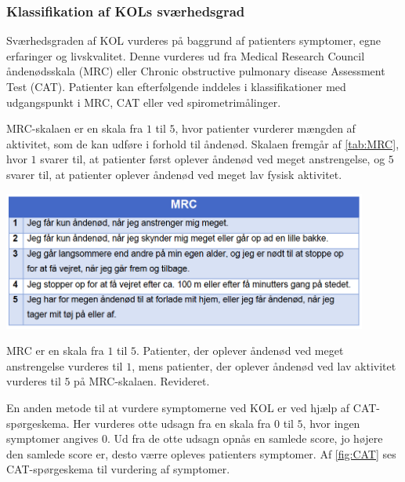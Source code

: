 \subsubsection{Klassifikation af KOLs sværhedsgrad} \label{sec:klassifikation}
Sværhedsgraden af KOL vurderes på baggrund af patienters symptomer, egne erfaringer og livskvalitet. Denne vurderes ud fra Medical Research Council åndenødsskala (MRC) eller Chronic obstructive pulmonary disease Assessment Test (CAT). Patienter kan efterfølgende inddeles i klassifikationer med udgangspunkt i MRC, CAT eller ved spirometrimålinger.\cite{Basisbogen2016}

 
MRC-skalaen er en skala fra $1$ til $5$, hvor patienter vurderer mængden af aktivitet, som de kan udføre i forhold til åndenød. Skalaen fremgår af \autoref{tab:MRC}, hvor $1$ svarer til, at patienter først oplever åndenød ved meget anstrengelse, og $5$ svarer til, at patienter oplever åndenød ved meget lav fysisk aktivitet.\cite{Basisbogen2016}

\begin{table} [H]
\centering
\includegraphics[width=0.9\textwidth]{figures/MRC}
\caption{MRC er en skala fra $1$ til $5$. Patienter, der oplever åndenød ved meget anstrengelse vurderes til $1$, mens patienter, der oplever åndenød ved lav aktivitet vurderes til $5$ på MRC-skalaen. Revideret\cite{Basisbogen2016}.}
\label{tab:MRC}
\end{table} 

\noindent
En anden metode til at vurdere symptomerne ved KOL er ved hjælp af CAT-spørgeskema. Her vurderes otte udsagn fra en skala fra $0$ til $5$, hvor ingen symptomer angives $0$. Ud fra de otte udsagn opnås en samlede score, jo højere den samlede score er, desto værre opleves patienters symptomer. Af \autoref{fig:CAT} ses CAT-spørgeskema til vurdering af symptomer.\cite{dsam2016,Basisbogen2016}

